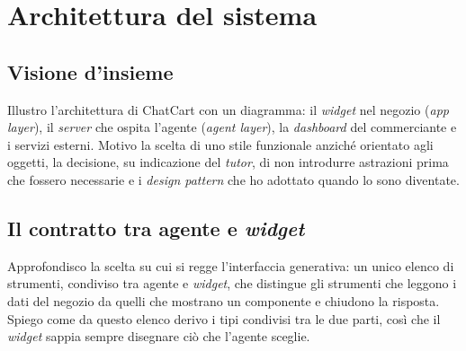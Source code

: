 
\section{Architettura del sistema}

\subsection{Visione d’insieme}

Illustro l’architettura di ChatCart con un diagramma: il \emph{widget} nel negozio (\emph{app
layer}), il \emph{server} che ospita l’agente (\emph{agent layer}), la \emph{dashboard} del
commerciante e i servizi esterni. Motivo la scelta di uno stile funzionale anziché orientato agli
oggetti, la decisione, su indicazione del \emph{tutor}, di non introdurre astrazioni prima che
fossero necessarie e i \emph{design pattern} che ho adottato quando lo sono diventate.

\subsection{Il contratto tra agente e \emph{widget}}
\label{sec:contratto}

Approfondisco la scelta su cui si regge l’interfaccia generativa: un unico elenco di strumenti,
condiviso tra agente e \emph{widget}, che distingue gli strumenti che leggono i dati del negozio da
quelli che mostrano un componente e chiudono la risposta. Spiego come da questo elenco derivo i tipi
condivisi tra le due parti, così che il \emph{widget} sappia sempre disegnare ciò che l’agente
sceglie.
